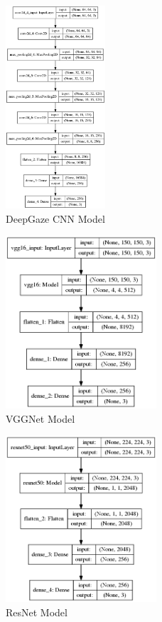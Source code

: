 \documentclass[a4paper, 12pt, oneside, BCOR1cm,toc=chapterentrywithdots]{scrbook}
\begin{document}
\begin{figure}[h]
\centering
\includegraphics[width=0.33\textwidth]{model_plot_DeepGaze.png}
\caption{DeepGaze CNN Model}
\label{fig:pic8}
\end{figure}

\begin{figure}[h]
\centering
\includegraphics[width=0.5\textwidth]{model_plot_VGG.png}
\caption{VGGNet Model}
\label{fig:pic14}
\end{figure}

\begin{figure}[h]
\centering
\includegraphics[width=0.5\textwidth]{model_plot_Resnet.png}
\caption{ResNet Model}
\label{fig:pic15}
\end{figure}
\end{document}
